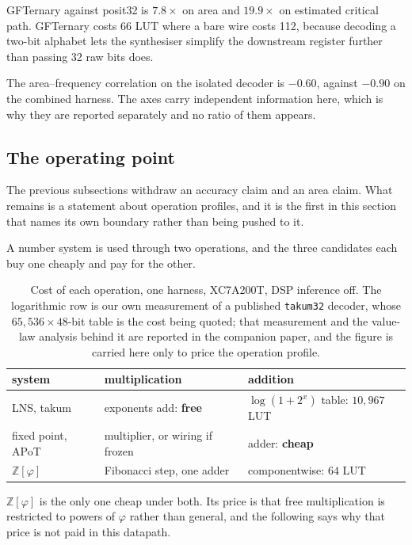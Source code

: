 \documentclass[11pt]{article}
\theoremstyle{definition}
\begin{document}
GFTernary against posit32 is $7.8\times$ on area and $19.9\times$ on estimated
critical path.
GFTernary costs 66 LUT where a bare wire costs 112, because decoding a two-bit
alphabet lets the synthesiser simplify the downstream register further than
passing 32 raw bits does.

The area--frequency correlation on the isolated decoder is $-0.60$, against
$-0.90$ on the combined harness. The axes carry independent information here,
which is why they are reported separately and no ratio of them appears.


\subsection{The operating point}
\label{sec:operatingpoint}

The previous subsections withdraw an accuracy claim and an area claim. What
remains is a statement about operation profiles, and it is the first in this
section that names its own boundary rather than being pushed to it.

A number system is used through two operations, and the three candidates each buy
one cheaply and pay for the other.

\begin{table}[t]\centering
\caption{Cost of each operation, one harness, XC7A200T, DSP inference off. The
logarithmic row is our own measurement of a published \texttt{takum32} decoder,
whose $65{,}536\times48$-bit table is the cost being quoted; that measurement and
the value-law analysis behind it are reported in the companion paper, and the
figure is carried here only to price the operation profile.}
\label{tab:bothops}
\begin{tabular}{lll}
\toprule
system & multiplication & addition \\
\midrule
LNS, takum & exponents add: \textbf{free} & $\log(1{+}2^{x})$ table: $10{,}967$ LUT \\
fixed point, APoT & multiplier, or wiring if frozen & adder: \textbf{cheap} \\
$\mathbb{Z}[\varphi]$ & Fibonacci step, one adder & componentwise: $64$ LUT \\
\bottomrule
\end{tabular}
\end{table}

$\mathbb{Z}[\varphi]$ is the only one cheap under both. Its price is that free
multiplication is restricted to powers of $\varphi$ rather than general, and the
following says why that price is not paid in this datapath.
\end{document}
